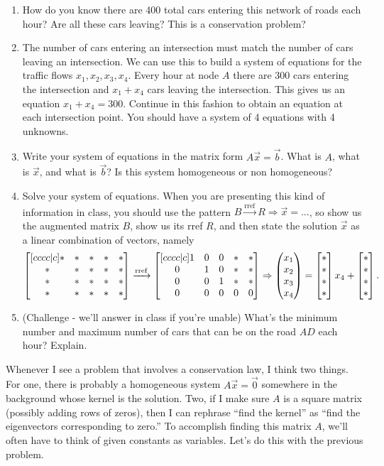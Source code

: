 \begin{problem}
\begin{enumerate}
 \item How do you know there are 400 total cars entering this network of roads each hour? Are all these cars leaving? This is a conservation problem?
 \item The number of cars entering an intersection must match the number of cars leaving an intersection.  We can use this to build a system of equations for the traffic flows $x_1, x_2,x_3, x_4$.  Every hour at node $A$ there are 300 cars entering the intersection and $x_1+x_4$ cars leaving the intersection. This gives us an equation $x_1+x_4=300$. Continue in this fashion to obtain an equation at each intersection point. You should have a system of 4 equations with 4 unknowns.
 \item 
Write your system of equations in the matrix form $A\vec x = \vec b$. What is $A$, what is $\vec x$, and what is $\vec b$? Is this system homogeneous or non homogeneous? 
 \item Solve your system of equations.  When you are presenting this kind of information in class, you should use the pattern $B\xrightarrow{\text{rref}}R\Rightarrow\vec x = ...$, so show us the augmented matrix $B$, show us its rref $R$, and then state the solution $\vec x$ as a linear combination of vectors, namely
$$
\begin{bmatrix} [cccc|c]*&*&*&*&*\\ *&*&*&*&*\\ *&*&*&*&*\\ *&*&*&*&* \end{bmatrix}
\xrightarrow{\text{rref}}\begin{bmatrix} [cccc|c]1&0&0&*&*\\ 0&1&0&*&*\\ 0&0&1&*&*\\ 0&0&0&0&0 \end{bmatrix}\Rightarrow \begin{pmatrix} x_1\\x_2\\x_3\\x_4 \end{pmatrix}=\begin{bmatrix} *\\ *\\ *\\ *  \end{bmatrix}x_4+\begin{bmatrix} *\\ *\\ *\\ *  \end{bmatrix}.$$

 \item (Challenge - we'll answer in class if you're unable) What's the minimum number and maximum number of cars that can be on the road $AD$ each hour? Explain.
\end{enumerate}
\end{problem}

Whenever I see a problem that involves a conservation law, I think two things. For one, there is probably a homogeneous system $A\vec x = \vec 0$ somewhere in the background whose kernel is the solution. Two, if I make sure $A$ is a square matrix (possibly adding rows of zeros), then I can rephrase ``find the kernel'' as ``find the eigenvectors corresponding to zero.'' To accomplish finding this matrix $A$, we'll often have to think of given constants as variables.  Let's do this with the previous problem. 


